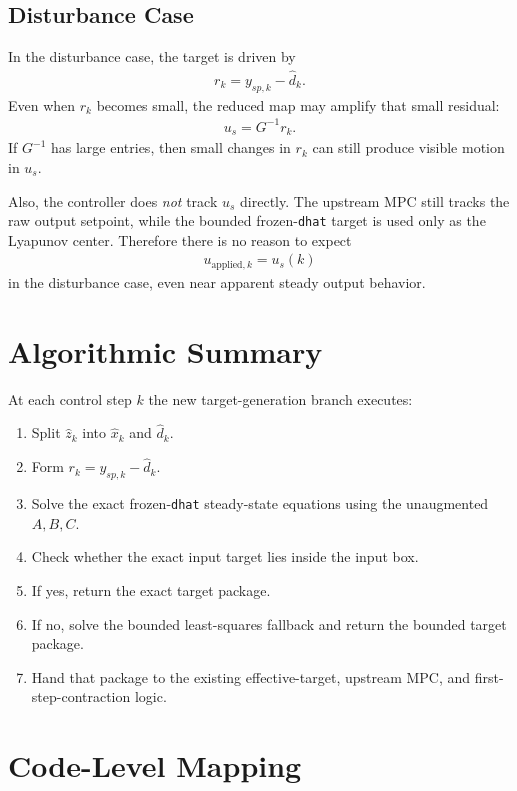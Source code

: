 \documentclass[11pt]{article}
\begin{document}
\subsection{Disturbance Case}

In the disturbance case, the target is driven by
\begin{align}
r_k = y_{sp,k} - \hat d_k.
\end{align}
Even when $r_k$ becomes small, the reduced map may amplify that small residual:
\begin{align}
u_s = G^{-1} r_k.
\end{align}
If $G^{-1}$ has large entries, then small changes in $r_k$ can still produce visible motion in $u_s$.

Also, the controller does \emph{not} track $u_s$ directly. The upstream MPC still tracks the raw output setpoint, while the bounded frozen-\texttt{dhat} target is used only as the Lyapunov center. Therefore there is no reason to expect
\begin{align}
u_{\mathrm{applied},k} = u_s(k)
\end{align}
in the disturbance case, even near apparent steady output behavior.

\section{Algorithmic Summary}

At each control step $k$ the new target-generation branch executes:
\begin{enumerate}
\item Split $\hat z_k$ into $\hat x_k$ and $\hat d_k$.
\item Form $r_k = y_{sp,k} - \hat d_k$.
\item Solve the exact frozen-\texttt{dhat} steady-state equations using the unaugmented $A,B,C$.
\item Check whether the exact input target lies inside the input box.
\item If yes, return the exact target package.
\item If no, solve the bounded least-squares fallback and return the bounded target package.
\item Hand that package to the existing effective-target, upstream MPC, and first-step-contraction logic.
\end{enumerate}

\section{Code-Level Mapping}
\end{document}
